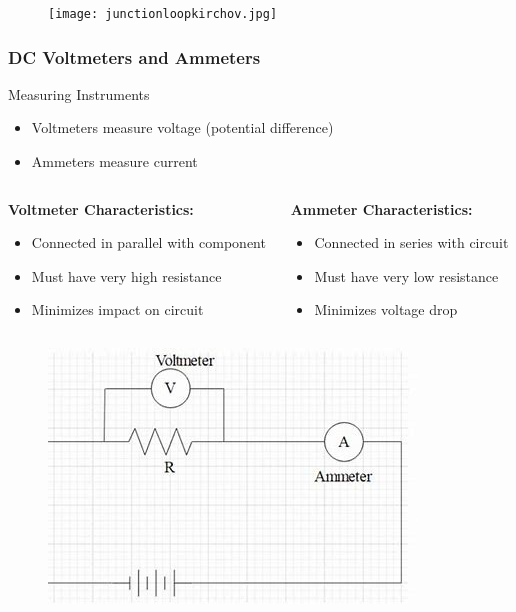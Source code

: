 \documentclass{beamer}
\begin{document}
    \begin{frame}{}
       
    \begin{figure}
        \centering
        \texttt{[image: junctionloopkirchov.jpg]}
    \end{figure}
\end{frame}

\begin{frame}
    \frametitle{DC Voltmeters and Ammeters}
    \begin{block}{Measuring Instruments}
        \begin{itemize}
            \item Voltmeters measure voltage (potential difference)
            \item Ammeters measure current
        \end{itemize}
    \end{block}
    \begin{columns}
        \begin{column}{0.5\textwidth}
            \textbf{Voltmeter Characteristics:}
            \begin{itemize}
                \item Connected in parallel with component
                \item Must have very high resistance
                \item Minimizes impact on circuit
            \end{itemize}
        \end{column}
        \begin{column}{0.5\textwidth}
            \textbf{Ammeter Characteristics:}
            \begin{itemize}
                \item Connected in series with circuit
                \item Must have very low resistance
                \item Minimizes voltage drop
            \end{itemize}
        \end{column}
    \end{columns}
    \begin{figure}
        \centering
        \includegraphics[width=0.3\linewidth]{phys12-circuits-ammeter-voltmeter-connection.jpg}
    \end{figure}
\end{frame}
\end{document}
